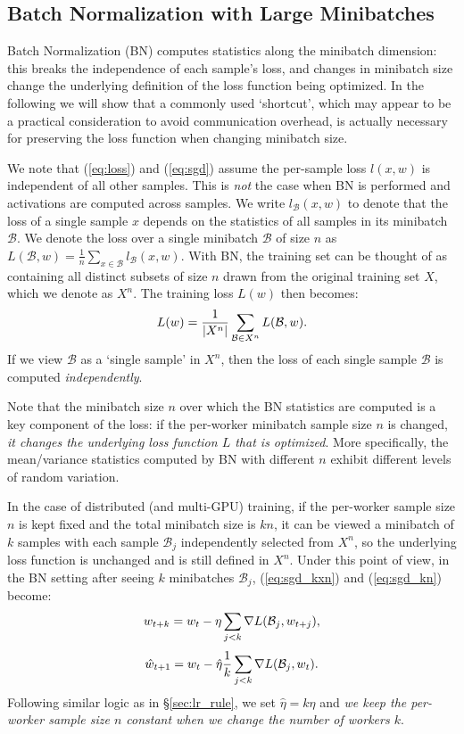\documentclass[10pt,twocolumn,letterpaper]{article}
\def\B{\mathcal{B}}
\def\Xn{X^n}
\newcommand{\eqntight}[2]{\vspace{-1mm}\begin{equation}\label{eq:#1}#2\vspace{-1mm}\end{equation}\ignorespaces}
\begin{document}
\subsection{Batch Normalization with Large Minibatches}\label{section:BN}

Batch Normalization (BN) \cite{Ioffe2015} computes statistics along the minibatch dimension: this breaks the independence of each sample's loss, and changes in minibatch size change the underlying definition of the loss function being optimized. In the following we will show that a commonly used `shortcut', which may appear to be a practical consideration to avoid communication overhead, is actually necessary for preserving the loss function when changing minibatch size.

We note that (\ref{eq:loss}) and (\ref{eq:sgd}) assume the per-sample loss $l(x,w)$ is independent of all other samples. This is \emph{not} the case when BN is performed and activations are computed across samples. We write $l_\B(x,w)$ to denote that the loss of a single sample $x$ depends on the statistics of all samples in its minibatch $\B$. We denote the loss over a single minibatch $\B$ of size $n$ as $L(\B,w) = \frac{1}{n}\sum_{x\in\B} l_\B(x,w)$. With BN, the training set can be thought of as containing all distinct subsets of size $n$ drawn from the original training set $X$, which we denote as $\Xn$. The training loss $L(w)$ then becomes:
 \eqntight{totallossbn}{ L(w) = \frac{1}{|\Xn|}\sum_{\B\in\Xn}L(\B,w). }
If we view $\B$ as a `single sample' in $\Xn$, then the loss of each single sample $\B$ is computed \emph{independently}.

Note that the minibatch size $n$ over which the BN statistics are computed is a key component of the loss: if the per-worker minibatch sample size $n$ is changed, \emph{it changes the underlying loss function $L$ that is optimized}. More specifically, the mean/variance statistics computed by BN with different $n$ exhibit different levels of random variation.

In the case of distributed (and multi-GPU) training, if the per-worker sample size $n$ is kept fixed and the total minibatch size is $kn$, it can be viewed a minibatch of $k$ samples with each sample $\B_j$ independently selected from $\Xn$, so the underlying loss function is unchanged and is still defined in $\Xn$.
Under this point of view, in the BN setting after seeing $k$ minibatches $\B_j$, (\ref{eq:sgd_kxn}) and (\ref{eq:sgd_kn}) become:
 \eqntight{sgdbn_k}{ w_{t+k} = w_{t} - \eta \sum_{j < k} \nabla L(\B_j,w_{t+j}), }
 \eqntight{sgdbn}{ \hat w_{t+1} = w_{t} - \hat \eta \frac{1}{k}\sum_{j<k} \nabla L(\B_j,w_t). }
Following similar logic as in \S\ref{sec:lr_rule}, we set $\hat \eta = k\eta$ and \emph{we keep the per-worker sample size $n$ constant when we change the number of workers $k$}.
\end{document}

